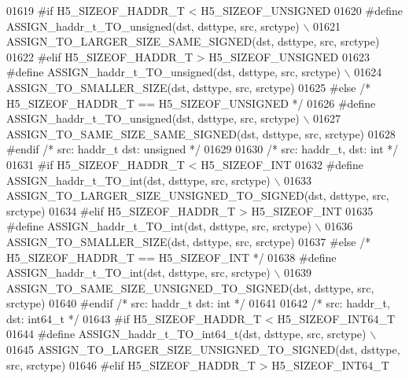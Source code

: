 \begin{DoxyCode}
01619 \textcolor{preprocessor}{#if H5\_SIZEOF\_HADDR\_T < H5\_SIZEOF\_UNSIGNED}
01620 \textcolor{preprocessor}{    #define ASSIGN\_haddr\_t\_TO\_unsigned(dst, dsttype, src, srctype) \(\backslash\)}
01621 \textcolor{preprocessor}{        ASSIGN\_TO\_LARGER\_SIZE\_SAME\_SIGNED(dst, dsttype, src, srctype)}
01622 \textcolor{preprocessor}{#elif H5\_SIZEOF\_HADDR\_T > H5\_SIZEOF\_UNSIGNED}
01623 \textcolor{preprocessor}{    #define ASSIGN\_haddr\_t\_TO\_unsigned(dst, dsttype, src, srctype) \(\backslash\)}
01624 \textcolor{preprocessor}{        ASSIGN\_TO\_SMALLER\_SIZE(dst, dsttype, src, srctype)}
01625 \textcolor{preprocessor}{#else }\textcolor{comment}{/* H5\_SIZEOF\_HADDR\_T == H5\_SIZEOF\_UNSIGNED */}\textcolor{preprocessor}{}
01626 \textcolor{preprocessor}{    #define ASSIGN\_haddr\_t\_TO\_unsigned(dst, dsttype, src, srctype) \(\backslash\)}
01627 \textcolor{preprocessor}{        ASSIGN\_TO\_SAME\_SIZE\_SAME\_SIGNED(dst, dsttype, src, srctype)}
01628 \textcolor{preprocessor}{#endif }\textcolor{comment}{/* src: haddr\_t dst: unsigned */}\textcolor{preprocessor}{}
01629 
01630 \textcolor{comment}{/* src: haddr\_t, dst: int */}
01631 \textcolor{preprocessor}{#if H5\_SIZEOF\_HADDR\_T < H5\_SIZEOF\_INT}
01632 \textcolor{preprocessor}{    #define ASSIGN\_haddr\_t\_TO\_int(dst, dsttype, src, srctype) \(\backslash\)}
01633 \textcolor{preprocessor}{        ASSIGN\_TO\_LARGER\_SIZE\_UNSIGNED\_TO\_SIGNED(dst, dsttype, src, srctype)}
01634 \textcolor{preprocessor}{#elif H5\_SIZEOF\_HADDR\_T > H5\_SIZEOF\_INT}
01635 \textcolor{preprocessor}{    #define ASSIGN\_haddr\_t\_TO\_int(dst, dsttype, src, srctype) \(\backslash\)}
01636 \textcolor{preprocessor}{        ASSIGN\_TO\_SMALLER\_SIZE(dst, dsttype, src, srctype)}
01637 \textcolor{preprocessor}{#else }\textcolor{comment}{/* H5\_SIZEOF\_HADDR\_T == H5\_SIZEOF\_INT */}\textcolor{preprocessor}{}
01638 \textcolor{preprocessor}{    #define ASSIGN\_haddr\_t\_TO\_int(dst, dsttype, src, srctype) \(\backslash\)}
01639 \textcolor{preprocessor}{        ASSIGN\_TO\_SAME\_SIZE\_UNSIGNED\_TO\_SIGNED(dst, dsttype, src, srctype)}
01640 \textcolor{preprocessor}{#endif }\textcolor{comment}{/* src: haddr\_t dst: int */}\textcolor{preprocessor}{}
01641 
01642 \textcolor{comment}{/* src: haddr\_t, dst: int64\_t */}
01643 \textcolor{preprocessor}{#if H5\_SIZEOF\_HADDR\_T < H5\_SIZEOF\_INT64\_T}
01644 \textcolor{preprocessor}{    #define ASSIGN\_haddr\_t\_TO\_int64\_t(dst, dsttype, src, srctype) \(\backslash\)}
01645 \textcolor{preprocessor}{        ASSIGN\_TO\_LARGER\_SIZE\_UNSIGNED\_TO\_SIGNED(dst, dsttype, src, srctype)}
01646 \textcolor{preprocessor}{#elif H5\_SIZEOF\_HADDR\_T > H5\_SIZEOF\_INT64\_T}

\end{DoxyCode}
